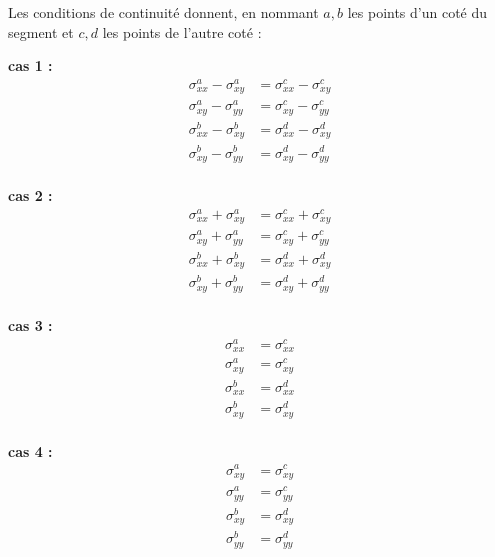 Les conditions de continuité donnent, en nommant $a,b$ les points d'un coté du segment et $c,d$ les points de l'autre coté : \\
\begin{center}
\begin{minipage}{0.4\textwidth}
\textbf{cas 1 : }
\begin{align*}
\sigma_{xx}^a - \sigma_{xy}^a &= \sigma_{xx}^c - \sigma_{xy}^c \\
 \sigma_{xy}^a - \sigma_{yy}^a &= \sigma_{xy}^c - \sigma_{yy}^c \\
 \sigma_{xx}^b - \sigma_{xy}^b &= \sigma_{xx}^d - \sigma_{xy}^d \\
 \sigma_{xy}^b - \sigma_{yy}^b &= \sigma_{xy}^d - \sigma_{yy}^d \\
\end{align*}
\end{minipage}
\vline
\begin{minipage}{0.4\textwidth}
\textbf{cas 2 :}
\begin{align*}
\sigma_{xx}^a + \sigma_{xy}^a &= \sigma_{xx}^c + \sigma_{xy}^c \\
 \sigma_{xy}^a + \sigma_{yy}^a &= \sigma_{xy}^c + \sigma_{yy}^c \\
 \sigma_{xx}^b +\sigma_{xy}^b &= \sigma_{xx}^d + \sigma_{xy}^d \\
 \sigma_{xy}^b + \sigma_{yy}^b &= \sigma_{xy}^d + \sigma_{yy}^d \\
\end{align*}
\end{minipage}

\begin{minipage}{0.4\textwidth}
\textbf{cas 3 :}
\begin{align*}
\sigma_{xx}^a &= \sigma_{xx}^c \\
 \sigma_{xy}^a  &= \sigma_{xy}^c \\
 \sigma_{xx}^b&= \sigma_{xx}^d\\
 \sigma_{xy}^b &= \sigma_{xy}^d  \\
\end{align*}
\end{minipage}
\vline
\begin{minipage}{0.4\textwidth}
\textbf{cas 4 :}
\begin{align*}
\sigma_{xy}^a &= \sigma_{xy}^c \\
\sigma_{yy}^a &=  \sigma_{yy}^c \\
\sigma_{xy}^b &= \sigma_{xy}^d \\
\sigma_{yy}^b &= \sigma_{yy}^d \\
\end{align*}
\end{minipage}
\end{center}

